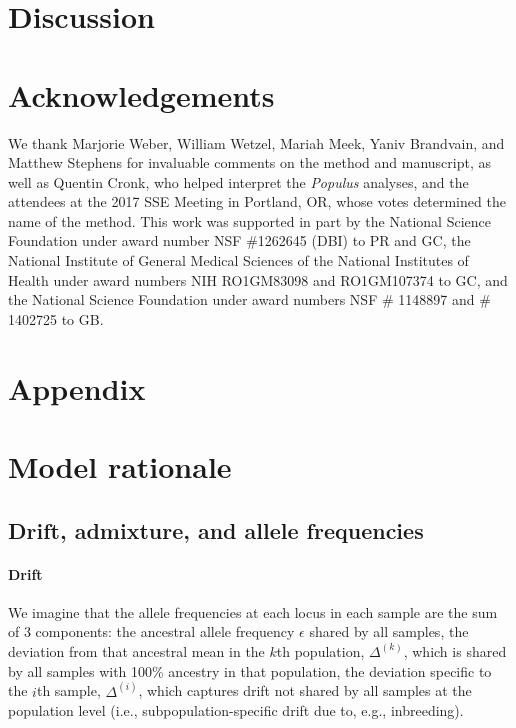 \documentclass[12pt]{article}
\begin{document}
\section*{Discussion}

\section*{Acknowledgements}

We thank Marjorie Weber, William Wetzel, Mariah Meek, Yaniv Brandvain, and Matthew Stephens 
for invaluable comments on the method and manuscript, 
as well as Quentin Cronk, who helped interpret the \textit{Populus} analyses, 
and the attendees at the 2017 SSE Meeting in Portland, OR, whose votes determined the name of the method.
This work was supported in part by 
the National Science Foundation under award number NSF \#1262645 (DBI) to PR and GC, 
the National Institute of General Medical Sciences of the National Institutes of Health under award numbers NIH RO1GM83098 and RO1GM107374 to GC,
and the National Science Foundation under award numbers NSF \# 1148897 and \# 1402725 to GB.

\newpage
\section*{Appendix}
\renewcommand{\theequation}{A\arabic{equation}}
\setcounter{equation}{0}
\renewcommand{\thetable}{A\arabic{table}}
\setcounter{table}{0}
\renewcommand{\thefigure}{A\arabic{figure}}
\setcounter{figure}{0}


\section{Model rationale}
\subsection{Drift, admixture, and allele frequencies}
\paragraph{Drift} 
We imagine that the allele frequencies at each locus in each sample are the sum of 3 components: 
the ancestral allele frequency $\epsilon$ shared by all samples,
the deviation from that ancestral mean in the $k$th population, $\Delta^{(k)}$,
which is shared by all samples with 100\% ancestry in that population,
the deviation specific to the $i$th sample, $\Delta^{(i)}$,
which captures drift not shared by all samples at the population level
(i.e., subpopulation-specific drift due to, e.g., inbreeding).
\end{document}
